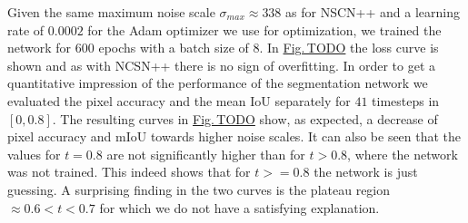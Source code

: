 %
Given the same maximum noise scale $\sigma_{max}\approx338$ as for NSCN++ and a learning rate of $0.0002$ for the Adam optimizer \cite{adam} we use for optimization, we trained the network for $600$ epochs with a batch size of $8$. In \hyperref[fig:]{Fig.\,TODO} the loss curve is shown and as with NCSN++ there is no sign of overfitting. In order to get a quantitative impression of the performance of the segmentation network we evaluated the pixel accuracy and the mean IoU separately for $41$ timesteps in $[0 ,0.8]$. The resulting curves in \hyperref[fig:]{Fig.\,TODO} show, as expected, a decrease of pixel accuracy and mIoU towards higher noise scales. It can also be seen that the values for $t=0.8$ are not significantly higher than for $t>0.8$, where the network was not trained. This indeed shows that for $t>=0.8$ the network is just guessing. A surprising finding in the two curves is the plateau region $\approx0.6<t<0.7$ for which we do not have a satisfying explanation.
%
